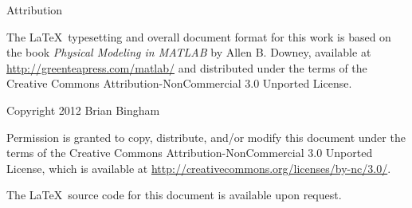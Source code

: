 \documentclass[11pt]{book}
\newcommand{\myreg}{\textsuperscript{{\tiny \textregistered}}}
\newcommand{\thisgls}{temp}  %
\begin{document}
\maketitle

\vspace*{0.2in} %
 
\begin{center}
{\Large \thetitle}

\vspace{0.25in}
Attribution 

\end{center}

The \LaTeX\ typesetting and overall document format for this work is based on the book \emph{Physical Modeling in MATLAB\myreg} by Allen B. Downey, available at \url{http://greenteapress.com/matlab/} and distributed under the terms of the  Creative Commons Attribution-NonCommercial 3.0 Unported License.

\vspace{0.25in}
\begin{center}
Copyright 2012 Brian Bingham
\end{center}

Permission is granted to copy, distribute, and/or modify this document
under the terms of the Creative Commons Attribution-NonCommercial 3.0 Unported
License, which is available at \url{http://creativecommons.org/licenses/by-nc/3.0/}.

The \LaTeX\ source code for this document is available upon request.




\setcounter{tocdepth}{1}
\tableofcontents

\mainmatter

\renewcommand{\thisgls}{dataacq}


\printglossary[type=\thisgls]
\glsresetall

\renewcommand{\thisgls}{model1}


\printglossary[type=\thisgls]
\glsresetall

\renewcommand{\thisgls}{measure}


\printglossary[type=\thisgls]
\glsresetall

\renewcommand{\thisgls}{compare}


\printglossary[type=\thisgls]
\glsresetall

\renewcommand{\thisgls}{strain}


\printglossary[type=\thisgls]
\glsresetall

\renewcommand{\thisgls}{linear}


\printglossary[type=\thisgls]
\glsresetall

\renewcommand{\thisgls}{model2}


\printglossary[type=\thisgls]
\glsresetall




%
%


\end{document}
